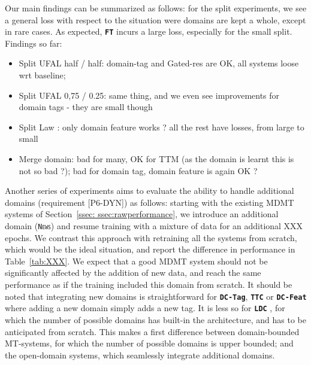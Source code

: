 \documentclass[11pt]{article}
\newcommand{\fyTodo}[1]{\Todo[FY:]{\textcolor{orange}{#1}}}
\newcommand{\domain}[1]{\texttt{\textsc{#1}}}
\newcommand{\system}[1]{\texttt{\textbf{#1}}}
\begin{document}
Our main findings can be summarized as follows: for the split experiments, we see a general loss with respect to the situation were domains are kept a whole, except in rare cases\fyTodo{To be completed}. As expected, \system{FT} incurs a large loss, especially for the small split. 
Findings so far:
\begin{itemize}
\item Split UFAL half / half: domain-tag and Gated-res are OK, all systems loose wrt baseline; 
\item Split UFAL 0,75 / 0.25: same thing, and we even see improvements for domain tags - they are small though
\item Split Law : only domain feature works ? all the rest have losses, from large to small
\item Merge domain: bad for many, OK for TTM (as the domain is learnt this is not so bad ?); bad for domain tag, domain feature is again OK ?
\end{itemize}

\fyTodo{We do need significance testing}

Another series of experiments aims to evaluate the ability to handle additional domains (requirement [P6-DYN]) as follows: starting with the existing MDMT systems of Section~\ref{ssec: ssec:rawperformance}, we introduce an additional domain (\domain{News}) and resume training with a mixture of data for an additional XXX epochs. We contrast this approach with retraining all the systems from scratch, which would be the ideal situation, and report the difference in performance in Table~\ref{tab:XXX}. We expect that a good MDMT system should not be significantly affected by the addition of new data, and reach the same performance as if the training included this domain from scratch. It should be noted that integrating new domains is straightforward for \system{DC-Tag}, \system{TTC} or \system{DC-Feat} where adding a new domain simply adds a new tag. It is less so for \system{LDC} \fyTodo{Complete effect of new domain}, for which the number of possible domains has built-in the architecture, and has to be anticipated from scratch. This makes a first difference between domain-bounded MT-systems, for which the number of possible domains is upper bounded; and the open-domain systems, which seamlessly integrate additional domains.
\end{document}
